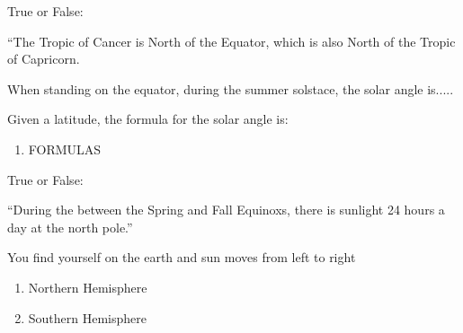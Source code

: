 \documentclass[noauthor,nooutcomes]{ximera}
\author{Bart Snapp}
\begin{document}
\maketitle


\begin{exercise}
  True or False:

  ``The Tropic of Cancer is North of the Equator, which is also North of the Tropic of Capricorn.
\end{exercise}


\begin{exercise}
  When standing on the equator, during the summer solstace, the solar angle is.....
\end{exercise}




\begin{exercise}
  Given a latitude, the formula for the solar angle is:
  \begin{enumerate}
  \item FORMULAS
  \end{enumerate}
\end{exercise}


\begin{exercise}
  True or False:

  ``During the between the Spring and Fall Equinoxs, there is sunlight 24 hours a day at the north pole.''
\end{exercise}



\begin{exercise}
  You find yourself on the earth and sun moves from left to right
  \begin{enumerate}
  \item Northern Hemisphere
  \item Southern Hemisphere
  \end{enumerate}
\end{exercise}





\end{document}
